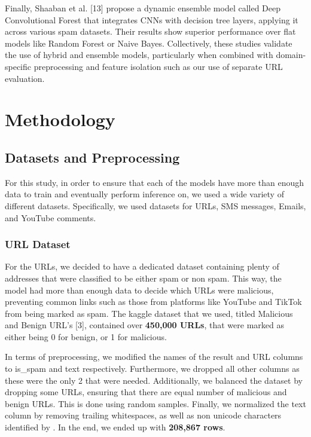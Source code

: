 \documentclass{article}
\begin{document}
\newline
\newline
Finally, Shaaban et al. [13] propose a dynamic ensemble model called Deep Convolutional Forest that integrates CNNs with decision tree layers, applying it across various spam datasets. Their results show superior performance over flat models like Random Forest or Naive Bayes. Collectively, these studies validate the use of hybrid and ensemble models, particularly when combined with domain-specific preprocessing and feature isolation such as our use of separate URL evaluation.


\section{Methodology}


\subsection{Datasets and Preprocessing}

For this study, in order to ensure that each of the models have more than enough data to train and eventually perform inference on, we used a wide variety of different datasets. Specifically, we used datasets for URLs, SMS messages, Emails, and YouTube comments.

\subsubsection{URL Dataset}

For the URLs, we decided to have a dedicated dataset containing plenty of addresses that were classified to be either spam or non spam. This way, the model had more than enough data to decide which URLs were malicious, preventing common links such as those from platforms like YouTube and TikTok from being marked as spam. The kaggle dataset that we used, titled Malicious and Benign URL’s [3], contained over \textbf{450,000 URLs}, that were marked as either being 0 for benign, or 1 for malicious. 
\newline

\noindent
In terms of preprocessing, we modified the names of the result and URL columns to is\_spam and text respectively. Furthermore, we dropped all other columns as these were the only 2 that were needed. Additionally, we balanced the dataset by dropping some URLs, ensuring that there are equal number of malicious and benign URLs. This is done using random samples. Finally, we normalized the text column by removing trailing whitespaces, as well as non unicode characters identified by \textquestiondown . In the end, we ended up with \textbf{208,867 rows}.
\end{document}
